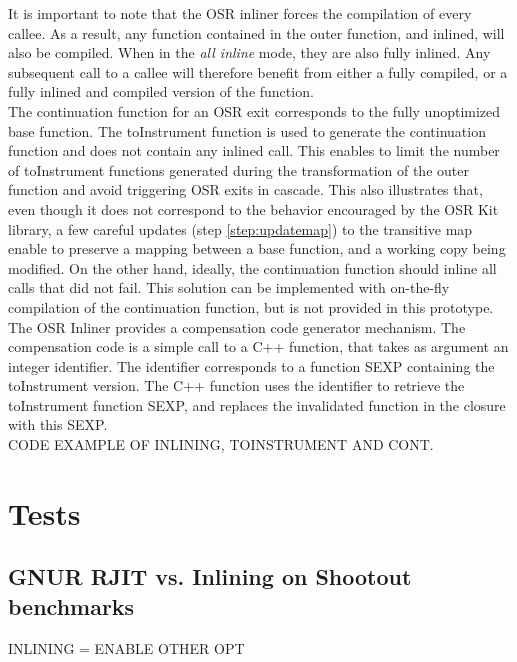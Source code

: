 It is important to note that the OSR inliner forces the compilation of every callee. 
As a result, any function contained in the outer function, and inlined, will also be compiled. 
When in the \textit{all inline} mode, they are also fully inlined.
Any subsequent call to a callee will therefore benefit from either a fully compiled, or a fully inlined and compiled version of the function.\\

The continuation function for an OSR exit corresponds to the fully unoptimized base function. 
The toInstrument function is used to generate the continuation function and does not contain any inlined call.
This enables to limit the number of toInstrument functions generated during the transformation of the outer function and avoid triggering OSR exits in cascade.
This also illustrates that, even though it does not correspond to the behavior encouraged by the OSR Kit library, a few careful updates (step \ref{step:updatemap}) to the transitive map enable to preserve a mapping between a base function, and a working copy being modified.
On the other hand, ideally, the continuation function should inline all calls that did not fail.
This solution can be implemented with on-the-fly compilation of the continuation function, but is not provided in this prototype.\\

The OSR Inliner provides a compensation code generator mechanism. 
The compensation code is a simple call to a C++ function, that takes as argument an integer identifier.
The identifier corresponds to a function SEXP containing the toInstrument version.
The C++ function uses the identifier to retrieve the toInstrument function SEXP, and replaces the invalidated function in the closure with this SEXP.\\

CODE EXAMPLE OF INLINING, TOINSTRUMENT AND CONT.\\

\section{Tests}
\subsection{GNUR RJIT vs. Inlining on Shootout benchmarks}
INLINING = ENABLE OTHER OPT\\

     
